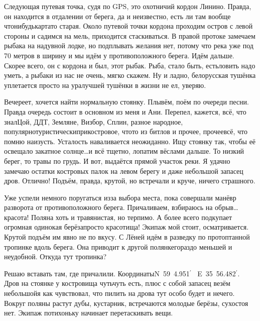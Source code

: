 Следующая путевая точка, судя по GPS, это охотничий кордон Линино. Правда, он находится в отдалении от берега, да и неизвестно, есть ли там вообще что\sdash нибудь\mdash карта\sdash то старая. Около путевой точки кордона проходим остров с левой стороны и садимся на мель, приходится стаскиваться. В правой протоке замечаем рыбака на надувной лодке, но подплывать желания нет, потому что река уже под 70 метров в ширину и мы идём у противоположного берега. Идём дальше. Скорее всего, он с кордона и был, этот рыбак. Рыба, стало быть, есть\mdash ловить надо уметь, а рыбаки из нас не очень, мягко скажем. Ну и ладно, белорусская тушёнка уплетается просто на ура\mdash лучшей тушёнки в жизни не ел, уверяю.

Вечереет, хочется найти нормальную стоянку. Плывём, поём по очереди песни. Правда очередь состоит в основном из меня и Ани. Перепел, кажется, всё, что знал\mdash Цой, ДДТ, Земляне, Визбор, Сплин, разное народное, популярно\sdash туристически\sdash прикостровое, что\sdash то из битлов и прочее, прочее\mdash всё, что помню наизусть. Усталость наваливается неожиданно. Ищу стоянку так, чтобы её освещало закатное солнце\ldots и всё тщетно, лопатим вёслами дальше. То низкий берег, то травы по грудь. И вот, выдаётся прямой участок реки. Я удачно замечаю остатки костровых палок на левом берегу и даже небольшой запасец дров. Отлично! Подъём, правда, крутой, но встречали и круче, ничего страшного.

Уже успели немного поругаться из\sdash за выбора места, пока совершали манёвр разворота от противоположного берега. Причаливаем, взбираюсь на обрыв\ldots красота! Поляна хоть и травянистая, но терпимо. А более всего подкупает огромная одинокая берёза\mdash просто красотища! Экипаж мой стоит, осматривается. Крутой подъём им явно не по вкусу. С Лёней идём в разведку по протоптанной тропинке вдоль берега. Она приводит к другой полянке\mdash гораздо меньшей и неудобной. Откуда тут тропинка? 

Решаю вставать там, где причалили. Координаты\mdash N~59\degree~4.951$^\prime$~ E~35\degree~56.482$^\prime$. Дров на стоянке у костровища чуть\sdash чуть есть, плюс с собой запасец везём небольшой\mdash я как чувствовал, что пилить на дрова тут особо будет и нечего. Вокруг поляны растут дубы, кустарник, встречаются молодые берёзы, сухостоя нет. Экипаж потихоньку начинает перетаскивать вещи. 

